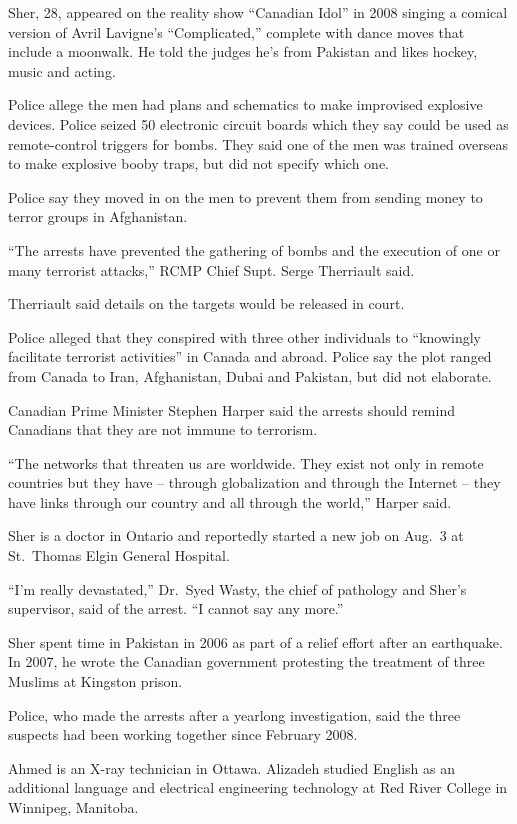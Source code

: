 ﻿\documentclass[12pt]{article}
\begin{document}
Sher, 28, appeared on the reality show ``Canadian Idol'' in 2008 singing a comical version of Avril
Lavigne's ``Complicated,'' complete with dance moves that include a moonwalk. He told the judges
he's from Pakistan and likes hockey, music and acting.

Police allege the men had plans and schematics to make improvised explosive devices. Police seized
50 electronic circuit boards which they say could be used as remote-control triggers for bombs. They
said one of the men was trained overseas to make explosive booby traps, but did not specify which
one.

Police say they moved in on the men to prevent them from sending money to terror groups in
Afghanistan.

``The arrests have prevented the gathering of bombs and the execution of one or many terrorist
attacks,'' RCMP Chief Supt. Serge Therriault said.

Therriault said details on the targets would be released in court.

Police alleged that they conspired with three other individuals to ``knowingly facilitate terrorist
activities'' in Canada and abroad. Police say the plot ranged from Canada to Iran, Afghanistan,
Dubai and Pakistan, but did not elaborate.

Canadian Prime Minister Stephen Harper said the arrests should remind Canadians that they are not
immune to terrorism.

``The networks that threaten us are worldwide. They exist not only in remote countries but they have
-- through globalization and through the Internet -- they have links through our country and all
through the world,'' Harper said.

Sher is a doctor in Ontario and reportedly started a new job on Aug.~3 at St.~Thomas Elgin General
Hospital.

``I'm really devastated,'' Dr.~Syed Wasty, the chief of pathology and Sher's supervisor, said of the
arrest. ``I cannot say any more.''

Sher spent time in Pakistan in 2006 as part of a relief effort after an earthquake. In 2007, he
wrote the Canadian government protesting the treatment of three Muslims at Kingston prison.

Police, who made the arrests after a yearlong investigation, said the three suspects had been
working together since February 2008.

Ahmed is an X-ray technician in Ottawa. Alizadeh studied English as an additional language and
electrical engineering technology at Red River College in Winnipeg, Manitoba.
\end{document}
